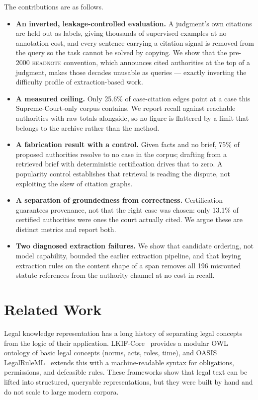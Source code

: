 \documentclass[10pt,conference]{IEEEtran}
\begin{document}
The contributions are as follows.

\begin{itemize}
\item \textbf{An inverted, leakage-controlled evaluation.} A judgment's own citations are
held out as labels, giving thousands of supervised examples at no annotation cost, and every
sentence carrying a citation signal is removed from the query so the task cannot be solved
by copying. We show that the pre-2000 \textsc{headnote} convention, which announces cited
authorities at the top of a judgment, makes those decades unusable as queries --- exactly
inverting the difficulty profile of extraction-based work.
\item \textbf{A measured ceiling.} Only 25.6\% of case-citation edges point at a case this
Supreme-Court-only corpus contains. We report recall against reachable authorities with raw
totals alongside, so no figure is flattered by a limit that belongs to the archive rather
than the method.
\item \textbf{A fabrication result with a control.} Given facts and no brief, 75\% of
proposed authorities resolve to no case in the corpus; drafting from a retrieved brief with
deterministic certification drives that to zero. A popularity control establishes that
retrieval is reading the dispute, not exploiting the skew of citation graphs.
\item \textbf{A separation of groundedness from correctness.} Certification guarantees
provenance, not that the right case was chosen: only 13.1\% of certified authorities were
ones the court actually cited. We argue these are distinct metrics and report both.
\item \textbf{Two diagnosed extraction failures.} We show that candidate ordering, not model
capability, bounded the earlier extraction pipeline, and that keying extraction rules on the
content shape of a span removes all 196 misrouted statute references from the authority
channel at no cost in recall.
\end{itemize}

\section{Related Work}

Legal knowledge representation has a long history of separating legal concepts from the
logic of their application. LKIF-Core~\cite{hoekstra2007} provides a modular OWL ontology
of basic legal concepts (norms, acts, roles, time), and OASIS LegalRuleML~\cite{legalruleml}
extends this with a machine-readable syntax for obligations, permissions, and defeasible
rules. These frameworks show that legal text can be lifted into structured, queryable
representations, but they were built by hand and do not scale to large modern corpora.
\end{document}
